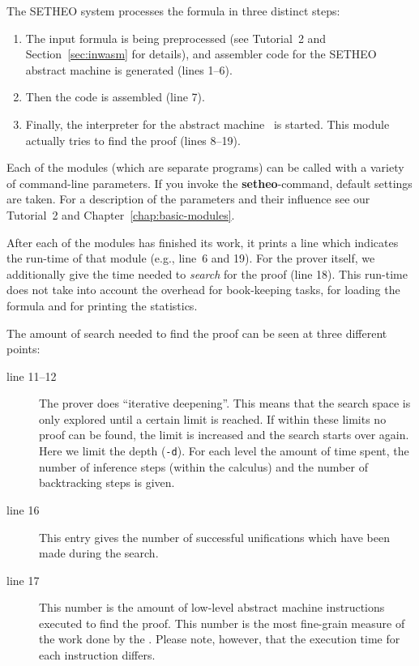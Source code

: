 The SETHEO system processes the formula in three distinct steps:
\begin{enumerate}
\item
The input formula is being preprocessed (see Tutorial~2 and
Section~\ref{sec:inwasm} for details), and assembler code for the
SETHEO abstract machine is generated (lines 1--6).
\item
Then the code is assembled (line 7).
\item
Finally, the interpreter for the abstract machine \SAM\  is started.
This module actually tries to find the proof (lines 8--19).
\end{enumerate}

Each of the modules (which are separate programs) can be called with
a variety of command-line parameters. If you invoke the {\bf setheo}-command,
default settings are taken. For a description of the parameters and their
influence see our Tutorial~2 and Chapter~\ref{chap:basic-modules}.

After each of the modules has finished its work, it prints a line
which indicates the run-time of that module (e.g., line~6 and 19).
For the prover itself, we additionally give the time needed to
{\em search\/} for the proof (line 18). This run-time does not
take into account the overhead for book-keeping tasks, for loading the
formula and for printing the statistics.

The amount of search needed to find the proof can be seen at three
different points:
\begin{description}
\item[line 11--12]
	The prover does ``iterative deepening''. This means that
	the search space is only explored until a certain limit
	is reached. If within these limits no proof can be found, the
	limit is increased and the search starts over again. Here
	we limit the depth ({\tt -d}). For each level the amount of
	time spent, the number of inference steps (within the calculus)
	and the number of
	backtracking steps is given.
\item[line 16]
	This entry gives the number of successful unifications which
	have been made during the search.
\item[line 17]
	This number is the amount of low-level abstract machine instructions
	executed to find the proof. This number is the most fine-grain
	measure of the work done by the \SAM. Please note, however, that
	the execution time for each instruction differs.
\end{description}


